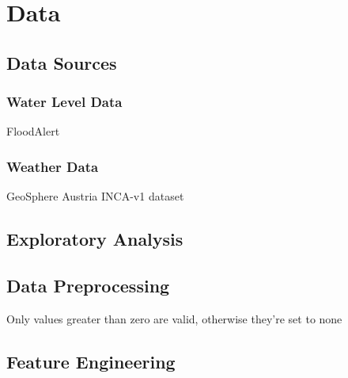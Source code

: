 \chapter{Data}

\section{Data Sources}
\subsection{Water Level Data}
FloodAlert \cite{FloodAlertWaterLevels}
\subsection{Weather Data}
GeoSphere Austria INCA-v1 dataset \cite{geosphereaustriaINCAv11Meteorologische2021}

\section{Exploratory Analysis}

\section{Data Preprocessing}
Only values greater than zero are valid, otherwise they're set to none


\section{Feature Engineering}
